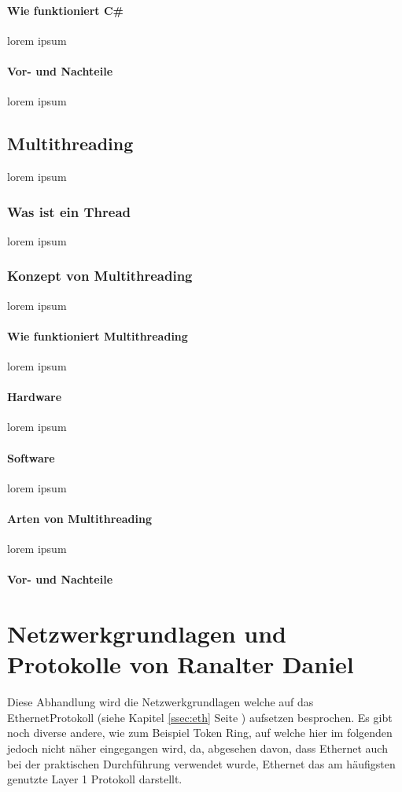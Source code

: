 \documentclass[12pt,a4paper]{report}
\begin{document}
\subsubsection{Wie funktioniert C\#}
lorem ipsum
\subsubsection{Vor- und Nachteile}
lorem ipsum
\section{Multithreading}
lorem ipsum
\subsection{Was ist ein Thread}
lorem ipsum
\subsection{Konzept von Multithreading}
lorem ipsum
\subsubsection{Wie funktioniert Multithreading}
lorem ipsum
\subsubsection{Hardware}
lorem ipsum
\subsubsection{Software}
lorem ipsum
\subsubsection{Arten von Multithreading}
lorem ipsum
\subsubsection{Vor- und Nachteile}


\chapter{Netzwerkgrundlagen und Protokolle von Ranalter Daniel}
Diese Abhandlung wird die Netzwerkgrundlagen welche auf das \glqq Ethernet\grqq Protokoll (siehe Kapitel \ref{ssec:eth}  Seite \pageref{ssec:eth}) aufsetzen besprochen. Es gibt noch diverse andere, wie zum Beispiel \glqq Token Ring\grqq , auf welche hier im folgenden jedoch nicht näher eingegangen wird, da, abgesehen davon, dass Ethernet auch bei der praktischen Durchführung verwendet wurde, Ethernet das am häufigsten genutzte Layer 1 Protokoll darstellt. 
\end{document}
